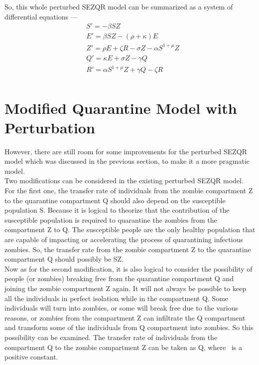 So, this whole perturbed SEZQR model can be summarized as a system of differential equations ---   
\begin{equation}  \label{eq:SEZQR}
\begin{split}
& S' = - \beta SZ \\
& E' = \beta SZ - (\rho + \kappa)E \\
& Z' = \rho E + \zeta R - \sigma Z - \alpha S^{1 + \mu} Z \\
& Q' = \kappa E + \sigma Z - \gamma Q \\
& R' = \alpha S^{1 + \mu} Z + \gamma Q - \zeta R \\
\end{split}
\end{equation}

\pagebreak
\section{Modified Quarantine Model with Perturbation}

However, there are still room for some improvements for the perturbed SEZQR model which was discussed in the previous section, to make it a more pragmatic model. \\

Two modifications can be considered in the existing perturbed SEZQR model. For the first one, the transfer rate of individuals from the zombie compartment Z to the quarantine compartment Q should also depend on the susceptible population S. Because it is logical to theorize that the contribution of the susceptible population is required to quarantine the zombies from the compartment Z to Q. The susceptible people are the only healthy population that are capable of impacting or accelerating the process of quarantining infectious zombies. So, the transfer rate from the zombie compartment Z to the quarantine compartment Q should possibly be \textsigma SZ. \\

Now as for the second modification, it is also logical to consider the possibility of people (or zombies) breaking free from the quarantine compartment Q and joining the zombie compartment Z again. It will not always be possible to keep all the individuals in perfect isolation while in the compartment Q. Some individuals will turn into zombies, or some will break free due to the various reasons, or zombies from the compartment Z can infiltrate the Q compartment and transform some of the individuals from Q compartment into zombies. So this possibility can be examined. The transfer rate of individuals from the compartment Q to the zombie compartment Z can be taken as \textomega Q, where \textomega \ is a positive constant. \\

